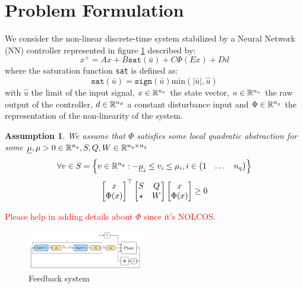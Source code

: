 \documentclass{ifacconf}
\theoremstyle{plain}
\newtheorem{assumption}{Assumption}
\begin{document}
\section{Problem Formulation}
We consider the non-linear discrete-time system stabilized by a Neural Network (NN) controller represented in figure \ref{fig:first_scheme} described by:
\begin{equation}
  x^{+} = A x + B \texttt{sat}(\bar{u}) + C \Phi(E x) + D d 
\end{equation}
where the saturation function \texttt{sat} is defined as:
$$
    \texttt{sat}(\bar{u}) = \texttt{sign}(\bar{u})\text{min}(|\bar{u}|, \hat{u})
$$
with $\hat{u}$ the limit of the input signal, $x \in {\mathbb{R}}^{n_x}$ the state vector, $\relax{u} \in {\mathbb{R}}^{n_u}$ the raw output of the controller, $d \in {\mathbb{R}}^{n_d}$ a constant disturbance input  and $\Phi \in {\mathbb{R}}^{n_q}$ the representation of the non-linearity of the system. 
\begin{assumption}\label{ass:nonlin}
We assume that $\Phi$ satisfies some local quadratic abstraction for some $\underline{\mu}, \relax{\mu} > 0 \in {\mathbb{R}}^{n_q}, \relax{S}, \relax{Q}, \relax{W} \in {\mathbb{R}}^{n_q \times n_q}$
\begin{equation}\label{eqn:nonlin-set}
\forall v \in \relax{S} = \left\{ v \in  {\mathbb{R}}^{n_q} : - \underline{\mu}_i \leq v_i \leq \relax{\mu}_i, i \in \left(\begin{matrix}1 & \dots & n_q\end{matrix}\right) \right\} 
\end{equation}
\begin{equation}\label{eqn:nonlin-inclusion}
\left[\begin{matrix}x \\ \Phi(x)\end{matrix}\right]^\top \left[\begin{matrix}\relax{S} & \relax{Q} \\ \star & \relax{W}\end{matrix}\right] \left[\begin{matrix}x \\ \Phi(x)\end{matrix}\right] \geq 0
\end{equation}
\end{assumption}\textcolor{red}{Please help in adding details about $\Phi$ since it's NOLCOS}.

\begin{figure}[H]
    \centering
    \includegraphics[width=0.45\textwidth]{Figures/first_scheme}
    \caption{Feedback system}
    \label{fig:first_scheme}
\end{figure}
\end{document}
